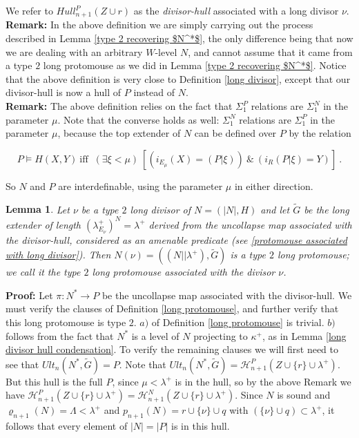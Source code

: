 \documentclass[12pt]{article}
\newtheorem{lem}[thm]{Lemma}
\begin{document}
We refer to $Hull_{n+1}^P ( Z \cup r )$ as the \textit{divisor-hull} associated with a long divisor $\nu$.\\

\textbf{Remark:}  In the above definition we are simply carrying out the process described in Lemma \ref{type 2 recovering $N^*$}, the only difference being that now we are dealing with an arbitrary $W$-level $N$, and cannot assume that it came from a type $2$ long protomouse as we did in Lemma \ref{type 2 recovering $N^*$}.  Notice that the above definition is very close to Definition \ref{long divisor}, except that our divisor-hull is now a hull of $P$ instead of $N$.\\

\textbf{Remark:}  The above definition relies on the fact that $\Sigma_1^P$ relations are $\Sigma_1^N$ in the parameter $\mu$.  Note that the converse holds as well: $\Sigma_1^N$ relations are $\Sigma_1^P$ in the parameter $\mu$, because the top extender of $N$ can be defined over $P$ by the relation

\[
P \models H ( X , Y ) \ \text{iff } \ ( \exists \xi < \mu ) \ [ ( i_{E_\mu} ( X) = (P | \xi ) ) \ \& \ ( i_R ( P | \xi ) = Y ) ] \ .
\]

So $N$ and $P$ are interdefinable, using the parameter $\mu$ in either direction.\\


\begin{lem}
Let $\nu$ be a type $2$ long divisor of $N = (|N| , H)$ and let $\tilde{G}$ be the long extender of length $(\lambda_{E_\nu}^+)^N = \lambda^+$ derived from the uncollapse map associated with the divisor-hull, considered as an amenable predicate (see \ref{protomouse associated with long divisor}).  Then $N ( \nu ) = ((N || \lambda^+ ), \tilde{G})$ is a type $2$ long protomouse; we call it the type $2$ long protomouse associated with the divisor $\nu$.
\end{lem}

\textbf{Proof:} Let $\pi : N^* \longrightarrow P$ be the uncollapse map associated with the divisor-hull.  We must verify the clauses of Definition \ref{long protomouse}, and further verify that this long protomouse is type $2$.  $a)$ of Definition \ref{long protomouse} is trivial.  $b)$ follows from the fact that $N^*$ is a level of $N$ projecting to $\kappa^+$, as in Lemma \ref{long divisor hull condensation}.  To verify the remaining clauses we will first need to see that $Ult_n (N^* , \tilde{G}) = P$.  Note that $Ult_n (N^* , \tilde{G}) = \mathcal{H}_{n+1}^P ( Z \cup \{ r \} \cup \lambda^+)$.  But this hull is the full $P$, since $\mu < \lambda^+$ is in the hull, so by the above Remark we have $\mathcal{H}_{n+1}^P ( Z \cup \{ r \} \cup \lambda^+) = \mathcal{H}_{n+1}^N ( Z \cup \{ r \} \cup \lambda^+)$.  Since $N$ is sound and $\varrho_{n+1} (N) = \Lambda < \lambda^+$ and $p _{n+1}(N) = r \cup \{ \nu \} \cup q$ with $( \{ \nu \} \cup q ) \subset \lambda^+$, it follows that every element of $|N| = |P|$ is in this hull.\\
\end{document}
